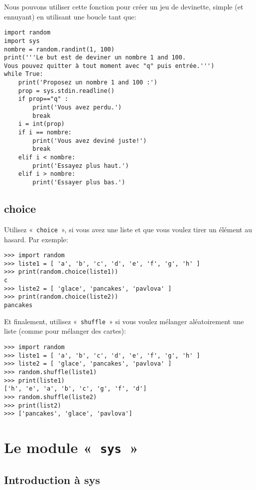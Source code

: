 Nous pouvons utiliser cette fonction pour créer un jeu de devinette, simple (et ennuyant) en utilisant une boucle tant que:

\begin{Verbatim}[frame=single,rulecolor=\color{gray}]
import random
import sys
nombre = random.randint(1, 100)
print('''Le but est de deviner un nombre 1 and 100.
Vous pouvez quitter à tout moment avec "q" puis entrée.''')
while True:
    print('Proposez un nombre 1 and 100 :')
    prop = sys.stdin.readline()
    if prop=="q" :
        print('Vous avez perdu.')
        break
    i = int(prop)
    if i == nombre:
        print('Vous avez deviné juste!')
        break
    elif i < nombre:
        print('Essayez plus haut.')
    elif i > nombre:
        print('Essayer plus bas.')
\end{Verbatim}

\subsection{choice}

Utilisez «~\verb+choice+~»,  si vous avez une liste et que vous voulez tirer un élément au hasard. Par exemple:

\begin{Verbatim}[frame=single,rulecolor=\color{gray}]
>>> import random
>>> liste1 = [ 'a', 'b', 'c', 'd', 'e', 'f', 'g', 'h' ]
>>> print(random.choice(liste1))
c
>>> liste2 = [ 'glace', 'pancakes', 'pavlova' ]
>>> print(random.choice(liste2))
pancakes
\end{Verbatim}

Et finalement, utilisez «~\verb+shuffle+~» si vous voulez mélanger aléatoirement une liste (comme pour mélanger des cartes):

\begin{Verbatim}[frame=single,rulecolor=\color{gray}]
>>> import random
>>> liste1 = [ 'a', 'b', 'c', 'd', 'e', 'f', 'g', 'h' ]
>>> liste2 = [ 'glace', 'pancakes', 'pavlova' ]
>>> random.shuffle(liste1)
>>> print(liste1)
['h', 'e', 'a', 'b', 'c', 'g', 'f', 'd']
>>> random.shuffle(liste2)
>>> print(list2)
>>> ['pancakes', 'glace', 'pavlova']
\end{Verbatim}

\section{Le module «~\texttt{sys}~»}
\subsection{Introduction à sys}

